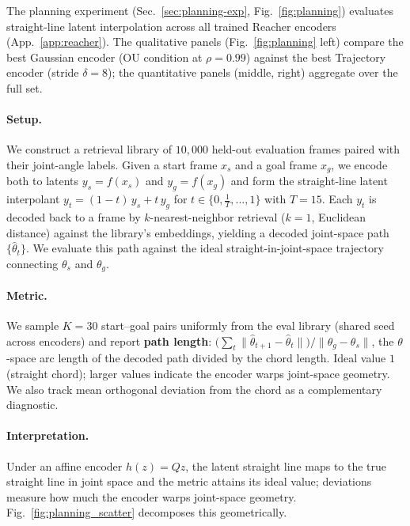 The planning experiment (Sec.~\ref{sec:planning-exp}, Fig.~\ref{fig:planning}) evaluates straight-line latent interpolation across all trained Reacher encoders (App.~\ref{app:reacher}). The qualitative panels (Fig.~\ref{fig:planning} left) compare the best Gaussian encoder (OU condition at $\rho = 0.99$) against the best Trajectory encoder (stride $\delta = 8$); the quantitative panels (middle, right) aggregate over the full set.

\paragraph{Setup.}
We construct a retrieval library of $10{,}000$ held-out evaluation frames paired with their joint-angle labels. Given a start frame $x_s$ and a goal frame $x_g$, we encode both to latents $y_s = f(x_s)$ and $y_g = f(x_g)$ and form the straight-line latent interpolant $y_t = (1-t)\, y_s + t\, y_g$ for $t \in \{0, \tfrac{1}{T}, \ldots, 1\}$ with $T = 15$. Each $y_t$ is decoded back to a frame by $k$-nearest-neighbor retrieval ($k = 1$, Euclidean distance) against the library's embeddings, yielding a decoded joint-space path $\{\hat{\theta}_t\}$. We evaluate this path against the ideal straight-in-joint-space trajectory connecting $\theta_s$ and $\theta_g$.

\paragraph{Metric.}
We sample $K = 30$ start--goal pairs uniformly from the eval library (shared seed across encoders) and report \textbf{path length}: $\big(\sum_t \|\hat{\theta}_{t+1} - \hat{\theta}_t\|\big) / \|\theta_g - \theta_s\|$, the $\theta$-space arc length of the decoded path divided by the chord length. Ideal value $1$ (straight chord); larger values indicate the encoder warps joint-space geometry. We also track mean orthogonal deviation from the chord as a complementary diagnostic.

\paragraph{Interpretation.}
Under an affine encoder $h(z) = Qz$, the latent straight line maps to the true straight line in joint space and the metric attains its ideal value; deviations measure how much the encoder warps joint-space geometry. Fig.~\ref{fig:planning_scatter} decomposes this geometrically.
